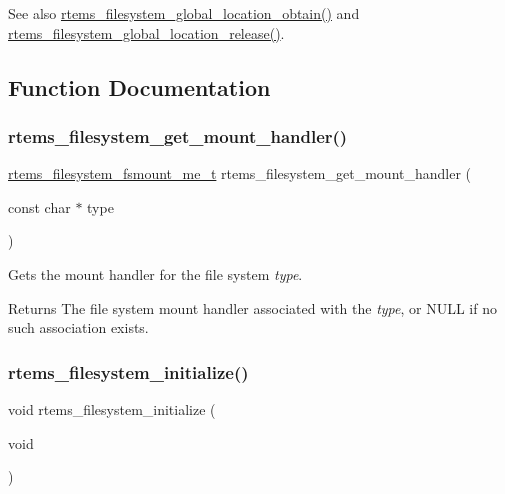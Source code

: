 \begin{DoxySeeAlso}{See also}
\mbox{\hyperlink{group__LibIOInternal_ga3df19d6d5f1f73b574478e7c4b42e643}{rtems\+\_\+filesystem\+\_\+global\+\_\+location\+\_\+obtain()}} and \mbox{\hyperlink{group__LibIOInternal_ga66aa5e6d0bbf4c03b533deac66fb328f}{rtems\+\_\+filesystem\+\_\+global\+\_\+location\+\_\+release()}}. 
\end{DoxySeeAlso}


\subsection{Function Documentation}
\mbox{\label{group__LibIO_ga62474d331c7b110859bcb85ccc85289a}} 
\subsubsection{\texorpdfstring{rtems\_filesystem\_get\_mount\_handler()}{rtems\_filesystem\_get\_mount\_handler()}}
{\footnotesize\ttfamily \mbox{\hyperlink{group__LibIOFSOps_gab86f790d75005100fc4d847f7cdc8aef}{rtems\+\_\+filesystem\+\_\+fsmount\+\_\+me\+\_\+t}} rtems\+\_\+filesystem\+\_\+get\+\_\+mount\+\_\+handler (\begin{DoxyParamCaption}\item[{const char $\ast$}]{type }\end{DoxyParamCaption})}



Gets the mount handler for the file system {\itshape type}. 

\begin{DoxyReturn}{Returns}
The file system mount handler associated with the {\itshape type}, or {\ttfamily N\+U\+LL} if no such association exists. 
\end{DoxyReturn}
\mbox{\label{group__LibIO_gad5344541746c6e86ef313e926ac2d7af}} 
\subsubsection{\texorpdfstring{rtems\_filesystem\_initialize()}{rtems\_filesystem\_initialize()}}
{\footnotesize\ttfamily void rtems\+\_\+filesystem\+\_\+initialize (\begin{DoxyParamCaption}\item[{void}]{ }\end{DoxyParamCaption})}



